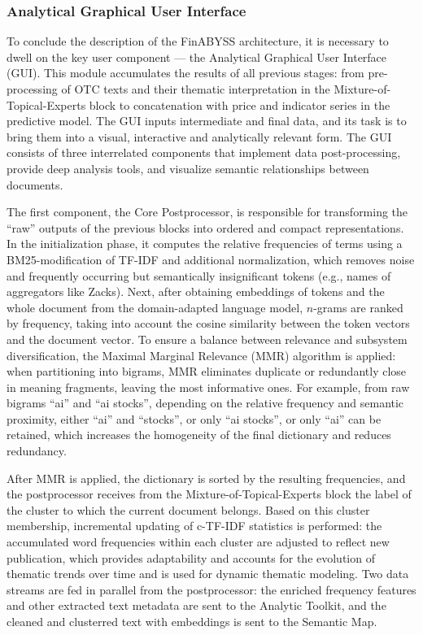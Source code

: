 \subsubsection{Analytical Graphical User Interface}
\label{sec:gui}
To conclude the description of the FinABYSS architecture, it is necessary to dwell on the key user
component --- the Analytical Graphical User Interface (GUI). This module accumulates the results
of all previous stages: from pre-processing of OTC texts and their thematic interpretation in
the Mixture-of-Topical-Experts block to concatenation with price and indicator series in the predictive
model. The GUI inputs intermediate and final data, and its task is to bring them into a visual, interactive
and analytically relevant form. The GUI consists of three interrelated components that implement data
post-processing, provide deep analysis tools, and visualize semantic relationships between documents.

The first component, the Core Postprocessor, is responsible for transforming the “raw” outputs
of the previous blocks into ordered and compact representations. In the initialization phase, it computes
the relative frequencies of terms using a BM25-modification of TF-IDF and additional normalization, which
removes noise and frequently occurring but semantically insignificant tokens (e.g., names of aggregators
like Zacks). Next, after obtaining embeddings of tokens and the whole document from the domain-adapted
language model, $n$-grams are ranked by frequency, taking into account the cosine similarity between
the token vectors and the document vector. To ensure a balance between relevance and subsystem
diversification, the Maximal Marginal Relevance (MMR) algorithm is applied: when partitioning into bigrams,
MMR eliminates duplicate or redundantly close in meaning fragments, leaving the most informative ones. For
example, from raw bigrams “ai” and “ai stocks”, depending on the relative frequency and semantic proximity,
either “ai” and “stocks”, or only “ai stocks”, or only “ai” can be retained, which increases the homogeneity
of the final dictionary and reduces redundancy.

After MMR is applied, the dictionary is sorted by the resulting frequencies, and the postprocessor receives
from the Mixture-of-Topical-Experts block the label of the cluster to which the current document belongs.
Based on this cluster membership, incremental updating of c-TF-IDF statistics is performed: the accumulated
word frequencies within each cluster are adjusted to reflect new publication, which provides adaptability
and accounts for the evolution of thematic trends over time and is used for dynamic thematic modeling. Two
data streams are fed in parallel from the postprocessor: the enriched frequency features and other extracted
text metadata are sent to the Analytic Toolkit, and the cleaned and clusterred text with embeddings is sent
to the Semantic Map.

